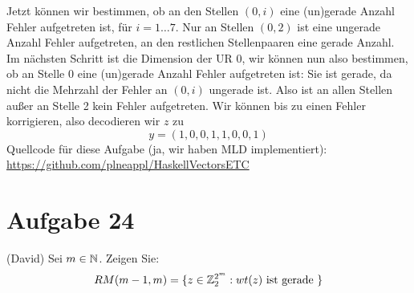 Jetzt können wir bestimmen, ob an den Stellen $(0, i)$ eine (un)gerade Anzahl Fehler aufgetreten ist, für $i=1\ldots 7$. Nur an Stellen $(0, 2)$ ist eine ungerade Anzahl Fehler aufgetreten, an den restlichen Stellenpaaren eine gerade Anzahl.\\
Im nächsten Schritt ist die Dimension der UR 0, wir können nun also bestimmen, ob an Stelle 0 eine (un)gerade Anzahl Fehler aufgetreten ist: Sie ist gerade, da nicht die Mehrzahl der Fehler an $(0, i)$ ungerade ist. Also ist an allen Stellen außer an Stelle 2 kein Fehler aufgetreten. Wir können bis zu einen Fehler korrigieren, also decodieren wir $z$ zu $$y = (1, 0, 0, 1, 1, 0, 0, 1)$$
Quellcode für diese Aufgabe (ja, wir haben MLD implementiert): \url{https://github.com/plneappl/HaskellVectorsETC}

\section*{Aufgabe 24}
(David)
Sei $m \in \mathbb{N}$. Zeigen Sie:
\begin{equation*}
	RM(m-1,m) = \lbrace z \in \mathbb{Z}^{2^m}_2 : wt(z) \text{ ist gerade } \rbrace
\end{equation*}

